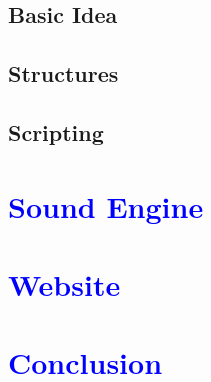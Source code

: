 \documentclass[article]{report}         %
\begin{document}
      \section{Basic Idea}
      \section{Structures}
      \section{Scripting}
		\chapter{\textcolor{blue}{Sound Engine}}
		\chapter{\textcolor{blue}{Website}}
		\chapter{\textcolor{blue}{Conclusion}}
		
\end{document}
